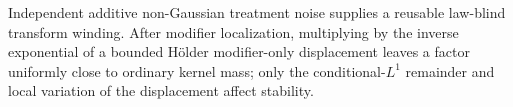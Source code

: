 Independent additive non-Gaussian treatment noise supplies a reusable law-blind transform winding. After modifier localization, multiplying by the inverse exponential of a bounded H\"older modifier-only displacement leaves a factor uniformly close to ordinary kernel mass; only the conditional-\(L^1\) remainder and local variation of the displacement affect stability.